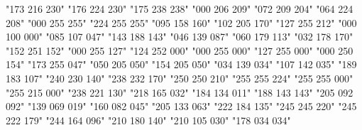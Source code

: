                {"173 216 230"}
              {"176 224 230"}
           {"175 238 238"}
           {"000 206 209"}
         {"072 209 204"}
                {"064 224 208"}
                     {"000 255 255"}
               {"224 255 255"}
               {"095 158 160"}
        {"102 205 170"}
               {"127 255 212"}
               {"000 100 000"}
         {"085 107 047"}
           {"143 188 143"}
                {"046 139 087"}
         {"060 179 113"}
          {"032 178 170"}
               {"152 251 152"}
             {"000 255 127"}
               {"124 252 000"}
                    {"000 255 000"}
               {"127 255 000"}
      {"000 250 154"}
             {"173 255 047"}
               {"050 205 050"}
             {"154 205 050"}
             {"034 139 034"}
               {"107 142 035"}
               {"189 183 107"}
                    {"240 230 140"}
           {"238 232 170"}
   {"250 250 210"}
             {"255 255 224"}
                   {"255 255 000"}
                     {"255 215 000"}
          {"238 221 130"}
                {"218 165 032"}
           {"184 134 011"}
               {"188 143 143"}
               {"205 092 092"}
             {"139 069 019"}
                   {"160 082 045"}
                     {"205 133 063"}
                {"222 184 135"}
                    {"245 245 220"}
                    {"245 222 179"}
              {"244 164 096"}
               {"210 180 140"}
                {"210 105 030"}
                {"178 034 034"}
